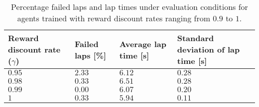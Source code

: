 \begin{table}[htb!]
\centering
\small
\begin{tabularx}{0.75\textwidth}{RLLL} 
    \hline
    \textbf{Reward discount rate ($\gamma$)} & \textbf{Failed laps [\%]} & \textbf{Average lap time [s]} & \textbf{Standard deviation of lap time [s]}\\ 
    \hline
    $0.95$  & $2.33$    & $6.12$  & $0.28$ \\      
    $0.98$  & $0.33$    & $6.51$  & $0.28$ \\
    $0.99$  & $0.00$    & $6.07$  & $0.20$ \\
    $1$     & $0.33$    & $5.94$  & $0.11$ \\
    \hline
\end{tabularx}
\caption[Evaluation results of end-to-end agents with various reward discount rates]{Percentage failed laps and lap times under evaluation conditions for agents trained with reward discount rates ranging from $0.9$ to $1$.}
\label{tab:gamma}
\end{table}
